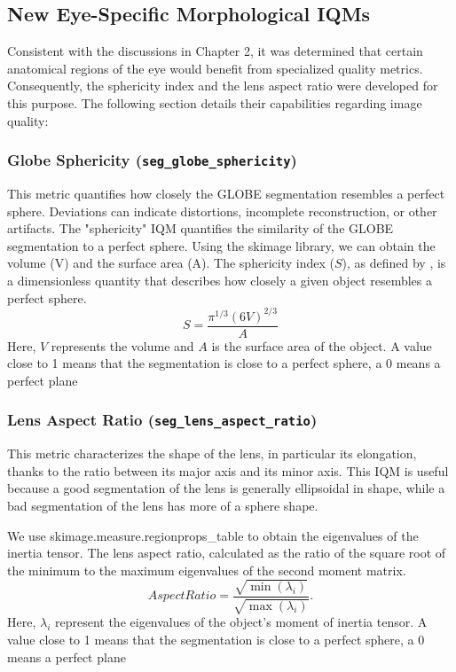 \subsection{New Eye-Specific Morphological IQMs}
\label{ssec:new_eye_iqms}
Consistent with the discussions in Chapter 2, it was determined that certain anatomical regions of the eye would benefit from specialized quality metrics. Consequently, the sphericity index and the lens aspect ratio were developed for this purpose. The following section details their capabilities regarding image quality:

\subsubsection{Globe Sphericity (\texttt{seg\_globe\_sphericity})}
This metric quantifies how closely the GLOBE segmentation resembles a perfect sphere. Deviations can indicate distortions, incomplete reconstruction, or other artifacts.
The "sphericity" IQM quantifies the similarity of the GLOBE segmentation to a perfect sphere. Using the skimage library, we can obtain the volume (V) and the surface area (A). The sphericity index ($S$), as defined by \cite{bullard_defining_2013}, is a dimensionless quantity that describes how closely a given object resembles a perfect sphere.
\begin{equation}
    S = \frac{\pi^{1/3} (6V)^{2/3}}{A}
    \label{eq:sphericity_index}
\end{equation}
Here, $V$ represents the volume and $A$ is the surface area of the object. A value close to 1 means that the segmentation is close to a perfect sphere, a 0 means a perfect plane

\subsubsection{Lens Aspect Ratio (\texttt{seg\_lens\_aspect\_ratio})}
This metric characterizes the shape of the lens, in particular its elongation, thanks to the ratio between its major axis and its minor axis. This IQM is useful because a good segmentation of the lens is generally ellipsoidal in shape, while a bad segmentation of the lens has more of a sphere shape.

We use skimage.measure.regionprops\_table to obtain the eigenvalues of the inertia tensor. The lens aspect ratio, calculated as the ratio of the square root of the minimum to the maximum eigenvalues of the second moment matrix.
\begin{equation}
    AspectRatio = \frac{\sqrt{\min(\lambda_i)}}{\sqrt{\max(\lambda_i)}}.
    \label{eq:aspect_ratio_definition}
\end{equation}
Here, $\lambda_i$ represent the eigenvalues of the object's moment of inertia tensor. A value close to 1 means that the segmentation is close to a perfect sphere, a 0 means a perfect plane


